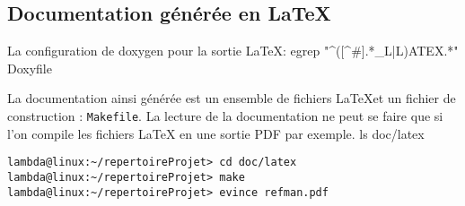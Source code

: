 \documentclass[12pt,a4paper,oneside,titlepage,final]{article}
\begin{document}
\subsection{Documentation générée en \LaTeX}
\label{annexe:latexOutputDoc}
La configuration de \gls{doxygen} pour la sortie \LaTeX :
\bash[stdout]
egrep "^([^#].*_L|L)ATEX.*" Doxyfile
\END

La documentation ainsi générée est un ensemble de fichiers \LaTeX et
un fichier de construction : \lstinline{Makefile}. La lecture de la
documentation ne peut se faire que si l'on compile les fichiers \LaTeX
en une sortie PDF par exemple.
\bash[stdout]
ls doc/latex
\END

\begin{lstlisting}[style=groolotScript,caption={Instruction pour compiler la documentation \LaTeX en PDF}]
lambda@linux:~/repertoireProjet> cd doc/latex
lambda@linux:~/repertoireProjet> make
lambda@linux:~/repertoireProjet> evince refman.pdf
\end{lstlisting}



\newpage \printbibheading
\printbibliography[nottype=online,check=notonline,heading=subbibliography,title={Bibliographiques}]
\printbibliography[check=online,heading=subbibliography,title={Webographiques}]

\printglossaries
\end{document}
